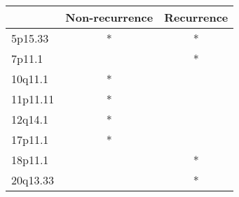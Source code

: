 \begin{tabular}{lcc}
\toprule
{} & Non-recurrence & Recurrence \\
\midrule
5p15.33  &              * &          * \\
7p11.1   &                &          * \\
10q11.1  &              * &            \\
11p11.11 &              * &            \\
12q14.1  &              * &            \\
17p11.1  &              * &            \\
18p11.1  &                &          * \\
20q13.33 &                &          * \\
\bottomrule
\end{tabular}

